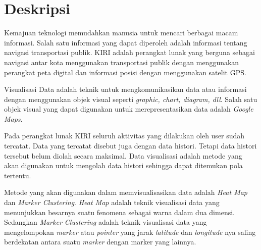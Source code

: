 \documentclass[a4paper,twoside]{article}
\begin{document}
\title{\@judultopik}
\author{\nama \textendash \@npm} 

\newcommand{\nama}{Jonathan Laksamana Purnomo}
\newcommand{\@npm}{2016730081}
\newcommand{\@judultopik}{Visualisasi Data Histori
KIRI pada Google Maps} %
\newcommand{\jumpemb}{1} %
\newcommand{\tanggal}{10/07/2020}


\maketitle


\section{Deskripsi}
Kemajuan teknologi memudahkan manusia untuk mencari berbagai macam informasi. Salah satu informasi yang dapat diperoleh adalah informasi tentang navigasi transportasi publik. KIRI  adalah perangkat lunak yang berguna sebagai navigasi antar kota menggunakan transportasi publik dengan menggunakan perangkat peta digital dan informasi posisi dengan menggunakan satelit GPS.

Visualisasi Data adalah teknik  untuk mengkomunikasikan data atau informasi dengan menggunakan objek visual  seperti \textit{graphic, chart, diagram, dll}. Salah satu objek visual yang dapat digunakan untuk merepresentasikan data adalah \textit{Google Maps}.

Pada perangkat lunak KIRI seluruh aktivitas yang dilakukan oleh user sudah tercatat. Data yang tercatat disebut juga dengan data histori. Tetapi data histori tersebut belum diolah secara maksimal. Data visualisasi adalah metode yang akan digunakan untuk mengolah data histori sehingga dapat ditemukan pola tertentu.

Metode yang akan digunakan dalam memvisualisasikan data adalah \textit{Heat Map } dan \textit{Marker Clustering}. \textit{Heat Map} adalah teknik visualisasi data yang menunjukkan besarnya suatu fenomena sebagai warna dalam dua dimensi. Sedangkan \textit{Marker Clustering}  adalah teknik visualisasi data  yang  mengelompokan \textit{marker} atau \textit{pointer} yang jarak \textit{latitude} dan \textit{longitude} nya saling berdekatan antara suatu \textit{marker} dengan marker yang lainnya.
\end{document}
